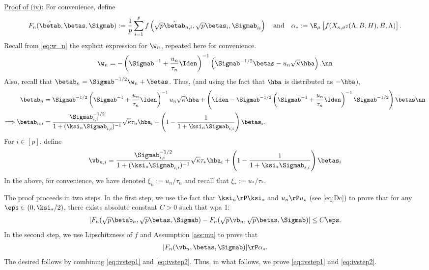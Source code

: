 \vp\noindent\underline{Proof of (iv):} 
For convenience, define 
$$F_n(\hat\betab,\betas,\Sigmab):=\frac{1}{p} \sum_{i=1}^{p} f\left(\sqrt{p}\hat\betab_{n,i},\sqrt{p}\betas_{i},\Sigmab_{ii}\right)\quad\text{and}\quad\alpha_*:=\E_\mu\left[f(X_{\kappa,\sigma^2}(\Lambda,B,H),B,\Lambda)\right].$$
Recall from \eqref{eq:w_n} the explicit expression for $\w_n$, repeated here for convenience.
\begin{align}
\w_n = -\left(\Sigmab^{-1}+\frac{u_n}{\tau_n}\Iden\right)^{-1}\left(\Sigmab^{-1/2}\betas-u_n\sqrt{\kappa}\hba\right).\nn
\end{align}
Also, recall that $\betab_n = \Sigmab^{-1/2}\w_n+\betas$. Thus,  (and using the fact that $\hba$ is distributed as $-\hba$),
\begin{align}
\betab_n &=\Sigmab^{-1/2}\left(\Sigmab^{-1}+\frac{u_n}{\tau_n}\Iden\right)^{-1}u_n\sqrt{\kappa}\hba + \left(\Iden-\Sigmab^{-1/2}\left(\Sigmab^{-1}+\frac{u_n}{\tau_n}\Iden\right)^{-1}\Sigmab^{-1/2}\right)\betas\nn\\
\Longrightarrow\betab_{n,i}&=\frac{{\Sigmab_{i,i}^{-1/2}}}{1+(\ksi_n\Sigmab_{i,i})^{-1}}\sqrt{\kappa}\tau_n\hba_i +\left(1-\frac{1}{1+\ksi_n\Sigmab_{i,i}}\right)\betas_i.\label{eq:betan}
\end{align}
For $i\in[p]$, define 
\begin{align}
\vb_{n,i} = \frac{{\Sigmab_{i,i}^{-1/2}}}{1+(\ksi_*\Sigmab_{i,i})^{-1}}\sqrt{\kappa}\tau_*\hba_i +\left(1-\frac{1}{1+\ksi_*\Sigmab_{i,i}}\right)\betas_i
\end{align}
In the above, for convenience, we have denoted $\xi_n:=u_n/\tau_n$ and recall that $\xi_*:=u_*/\tau_*$. 


The proof proceeds in two steps. In the first step, we use the fact that $\ksi_n\rP\ksi_*$ and $u_n\rP u_\star$ (see \eqref{eq:Dc}) to prove that for any $\eps\in(0,\ksi_*/2)$, there exists absolute constant $C>0$ such that wpa 1:
\begin{align}\label{eq:ivstep1}
|F_n(\sqrt{p}\betab_n,\sqrt{p}\betas,\Sigmab) - F_n(\sqrt{p}\vb_n,\sqrt{p}\betas,\Sigmab) | \leq C\eps.
\end{align}
In the second step, we use Lipschitzness of $f$ and Assumption \ref{ass:mu} to prove that 
\begin{align}
|F_n(\vb_n,\betas,\Sigmab)| \rP \alpha_*.\label{eq:ivstep2}
\end{align}
The desired follows by combining \eqref{eq:ivstep1} and \eqref{eq:ivstep2}. Thus, in what follows, we prove \eqref{eq:ivstep1} and \eqref{eq:ivstep2}.


